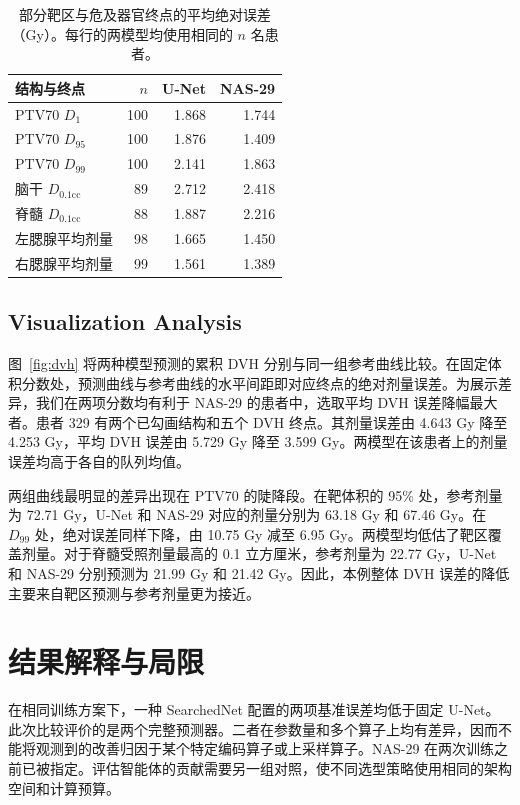 \documentclass[UTF8,letterpaper,twocolumn,11pt,fontset=fandol]{ctexart}
\begin{document}
\begin{table}[t]
\centering\small
\begin{tabular}{lrrr}
\toprule
结构与终点 & $n$ & U-Net & NAS-29\\
\midrule
PTV70 $D_1$ & 100 & 1.868 & 1.744\\
PTV70 $D_{95}$ & 100 & 1.876 & 1.409\\
PTV70 $D_{99}$ & 100 & 2.141 & 1.863\\
脑干 $D_{0.1\mathrm{cc}}$ & 89 & 2.712 & 2.418\\
脊髓 $D_{0.1\mathrm{cc}}$ & 88 & 1.887 & 2.216\\
左腮腺平均剂量 & 98 & 1.665 & 1.450\\
右腮腺平均剂量 & 99 & 1.561 & 1.389\\
\bottomrule
\end{tabular}
\caption{部分靶区与危及器官终点的平均绝对误差（Gy）。每行的两模型均使用相同的 $n$ 名患者。}
\label{tab:endpoints}
\end{table}



\subsection{Visualization Analysis}
图~\ref{fig:dvh} 将两种模型预测的累积 DVH 分别与同一组参考曲线比较。在固定体积分数处，预测曲线与参考曲线的水平间距即对应终点的绝对剂量误差。为展示差异，我们在两项分数均有利于 NAS-29 的患者中，选取平均 DVH 误差降幅最大者。患者 329 有两个已勾画结构和五个 DVH 终点。其剂量误差由 4.643 Gy 降至 4.253 Gy，平均 DVH 误差由 5.729 Gy 降至 3.599 Gy。两模型在该患者上的剂量误差均高于各自的队列均值。

两组曲线最明显的差异出现在 PTV70 的陡降段。在靶体积的 95\% 处，参考剂量为 72.71 Gy，U-Net 和 NAS-29 对应的剂量分别为 63.18 Gy 和 67.46 Gy。在 $D_{99}$ 处，绝对误差同样下降，由 10.75 Gy 减至 6.95 Gy。两模型均低估了靶区覆盖剂量。对于脊髓受照剂量最高的 0.1 立方厘米，参考剂量为 22.77 Gy，U-Net 和 NAS-29 分别预测为 21.99 Gy 和 21.42 Gy。因此，本例整体 DVH 误差的降低主要来自靶区预测与参考剂量更为接近。

\section{结果解释与局限}
在相同训练方案下，一种 SearchedNet 配置的两项基准误差均低于固定 U-Net。此次比较评价的是两个完整预测器。二者在参数量和多个算子上均有差异，因而不能将观测到的改善归因于某个特定编码算子或上采样算子。NAS-29 在两次训练之前已被指定。评估智能体的贡献需要另一组对照，使不同选型策略使用相同的架构空间和计算预算。
\end{document}
